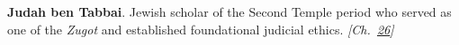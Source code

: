 \textbf{Judah ben Tabbai}. Jewish scholar of the Second Temple period who served as one of the \emph{Zugot} and established foundational judicial ethics. \emph{[Ch.~\hyperref[ch:jewishcalendar]{26}]}

